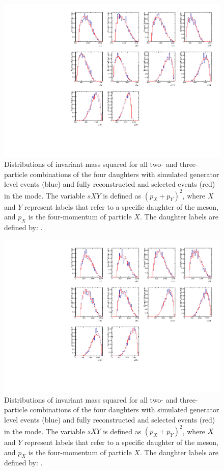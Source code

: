 \begin{figure}[h]
\centering
\includegraphics[width=0.9\linewidth]{figures/results/dalitzDist_KPiPiPi.pdf}
\caption{Distributions of invariant mass squared for all two- and three-particle combinations of the four \Dz daughters with simulated generator level events (blue) and fully reconstructed and selected events (red) in the \kpipipi mode. The variable $sXY$ is defined as $(p_X + p_Y)^2$, where $X$ and $Y$ represent labels that refer to a specific daughter of the \Dz meson, and $p_X$ is the four-momentum of particle $X$. The \Dz daughter labels are defined by: .}
\label{dalitzk3pi}
\end{figure}

\begin{figure}[h]
\centering
\includegraphics[width=0.9\linewidth]{figures/results/dalitzDist_PiPiPiPi.pdf}
\caption{Distributions of invariant mass squared for all two- and three-particle combinations of the four \Dz daughters with simulated generator level events (blue) and fully reconstructed and selected events (red) in the \pipipipi mode. The variable $sXY$ is defined as $(p_X + p_Y)^2$, where $X$ and $Y$ represent labels that refer to a specific daughter of the \Dz meson, and $p_X$ is the four-momentum of particle $X$. The \Dz daughter labels are defined by: .}
\label{dalitz4pi}
\end{figure}

